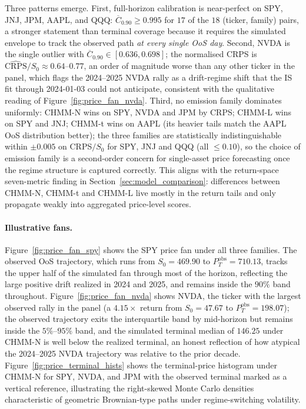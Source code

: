 Three patterns emerge.
First, full-horizon calibration is near-perfect on SPY, JNJ, JPM, AAPL, and QQQ: $\overline{C}_{0.90} \ge 0.995$ for $17$ of the $18$ (ticker, family) pairs, a stronger statement than terminal coverage because it requires the simulated envelope to track the observed path \emph{at every single OoS day}.
Second, NVDA is the single outlier with $\overline{C}_{0.90} \in [0.636, 0.698]$; the normalised CRPS is $\widehat{\text{CRPS}}/S_0 \approx 0.64$--$0.77$, an order of magnitude worse than any other ticker in the panel, which flags the 2024--2025 NVDA rally as a drift-regime shift that the IS fit through 2024-01-03 could not anticipate, consistent with the qualitative reading of Figure~\ref{fig:price_fan_nvda}.
Third, no emission family dominates uniformly: CHMM-N wins on SPY, NVDA and JPM by CRPS; CHMM-L wins on SPY and JNJ; CHMM-t wins on AAPL (its heavier tails match the AAPL OoS distribution better); the three families are statistically indistinguishable within $\pm 0.005$ on CRPS$/S_0$ for SPY, JNJ and QQQ (all $\le 0.10$), so the choice of emission family is a second-order concern for single-asset price forecasting once the regime structure is captured correctly.
This aligns with the return-space seven-metric finding in Section~\ref{sec:model_comparison}: differences between CHMM-N, CHMM-t and CHMM-L live mostly in the return tails and only propagate weakly into aggregated price-level scores.

\paragraph{Illustrative fans.}
Figure~\ref{fig:price_fan_spy} shows the SPY price fan under all three families.
The observed OoS trajectory, which runs from $S_0 = 469.90$ to $P^{\text{obs}}_T = 710.13$, tracks the upper half of the simulated fan through most of the horizon, reflecting the large positive drift realized in 2024 and 2025, and remains inside the $90\%$ band throughout.
Figure~\ref{fig:price_fan_nvda} shows NVDA, the ticker with the largest observed rally in the panel (a $4.15\times$ return from $S_0 = 47.67$ to $P^{\text{obs}}_T = 198.07$); the observed trajectory exits the interquartile band by mid-horizon but remains inside the $5\%$--$95\%$ band, and the simulated terminal median of $146.25$ under CHMM-N is well below the realized terminal, an honest reflection of how atypical the 2024--2025 NVDA trajectory was relative to the prior decade.
Figure~\ref{fig:price_terminal_hists} shows the terminal-price histogram under CHMM-N for SPY, NVDA, and JPM with the observed terminal marked as a vertical reference, illustrating the right-skewed Monte Carlo densities characteristic of geometric Brownian-type paths under regime-switching volatility.

